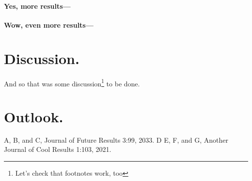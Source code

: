 \documentclass[
    papertype=a4paper,
]{phfextendedabstract}
\begin{document}
\paragraph{Yes, more results---}
\lipsum[6]

\paragraph{Wow, even more results---}
\lipsum[7]

\section{Discussion.}
\lipsum[8]

And so that was some discussion\footnote{Let's check that footnotes work, too} to be done.

\section{Outlook.}
\lipsum[9]


\begin{thebibliography}{9}
  A, B, and C, Journal of Future Results 3:99, 2033.
  D E, F, and G, Another Journal of Cool Results 1:103, 2021.
\end{thebibliography}
\end{document}

